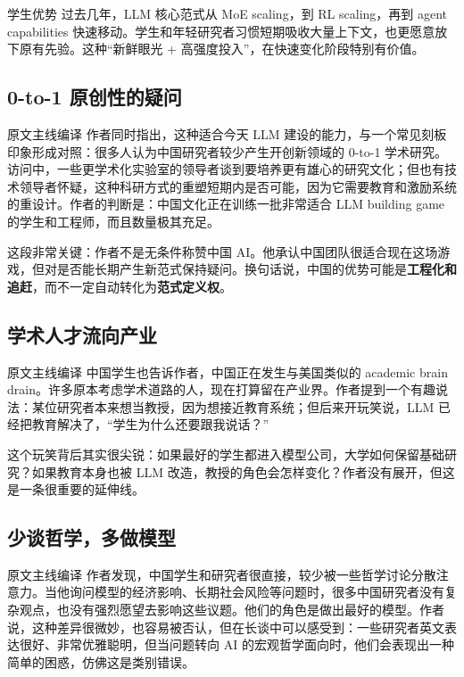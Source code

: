 \begin{importantbox}{学生优势}
过去几年，LLM 核心范式从 MoE scaling，到 RL scaling，再到 agent capabilities 快速移动。学生和年轻研究者习惯短期吸收大量上下文，也更愿意放下原有先验。这种``新鲜眼光 + 高强度投入''，在快速变化阶段特别有价值。
\end{importantbox}

\subsection{0-to-1 原创性的疑问}

\begin{translationbox}{原文主线编译}
作者同时指出，这种适合今天 LLM 建设的能力，与一个常见刻板印象形成对照：很多人认为中国研究者较少产生开创新领域的 0-to-1 学术研究。访问中，一些更学术化实验室的领导者谈到要培养更有雄心的研究文化；但也有技术领导者怀疑，这种科研方式的重塑短期内是否可能，因为它需要教育和激励系统的重设计。作者的判断是：中国文化正在训练一批非常适合 LLM building game 的学生和工程师，而且数量极其充足。
\end{translationbox}

这段非常关键：作者不是无条件称赞中国 AI。他承认中国团队很适合现在这场游戏，但对是否能长期产生新范式保持疑问。换句话说，中国的优势可能是\textbf{工程化和追赶}，而不一定自动转化为\textbf{范式定义权}。

\subsection{学术人才流向产业}

\begin{translationbox}{原文主线编译}
中国学生也告诉作者，中国正在发生与美国类似的 academic brain drain。许多原本考虑学术道路的人，现在打算留在产业界。作者提到一个有趣说法：某位研究者本来想当教授，因为想接近教育系统；但后来开玩笑说，LLM 已经把教育解决了，``学生为什么还要跟我说话？''
\end{translationbox}

这个玩笑背后其实很尖锐：如果最好的学生都进入模型公司，大学如何保留基础研究？如果教育本身也被 LLM 改造，教授的角色会怎样变化？作者没有展开，但这是一条很重要的延伸线。

\subsection{少谈哲学，多做模型}

\begin{translationbox}{原文主线编译}
作者发现，中国学生和研究者很直接，较少被一些哲学讨论分散注意力。当他询问模型的经济影响、长期社会风险等问题时，很多中国研究者没有复杂观点，也没有强烈愿望去影响这些议题。他们的角色是做出最好的模型。作者说，这种差异很微妙，也容易被否认，但在长谈中可以感受到：一些研究者英文表达很好、非常优雅聪明，但当问题转向 AI 的宏观哲学面向时，他们会表现出一种简单的困惑，仿佛这是类别错误。
\end{translationbox}

